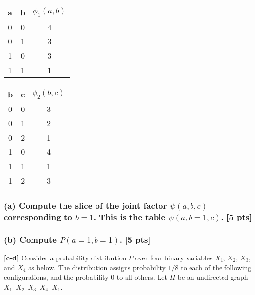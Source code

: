 \documentclass[twoside,11pt]{article}\usepackage{amsmath,amsfonts,amsthm,fullpage}
\begin{document}
\begin{table}[!htb]

    \begin{minipage}{.5\linewidth}

      \centering

    \begin{tabular}{cc|c}
    a & b & $\phi_1(a,b)$ \\ \hline
    0 & 0 & 4             \\
    0 & 1 & 3             \\
    1 & 0 & 3             \\
    1 & 1 & 1             \\
    \end{tabular}

    \end{minipage}%
    \begin{minipage}{.5\linewidth}
      \centering
     \begin{tabular}{cc|c}
    b & c & $\phi_2(b,c)$ \\ \hline
    0 & 0 & 3             \\
    0 & 1 & 2             \\
    0 & 2 & 1             \\
    1 & 0 & 4             \\
    1 & 1 & 1             \\
    1 & 2 & 3             \\
    \end{tabular}
    \end{minipage}
\end{table}

\subsubsection*{(a) Compute the slice of the joint factor $\psi(a,b,c)$ corresponding to $b = 1$. This is the table $\psi(a,b=1,c)$. [5 pts]}

\subsubsection*{(b) Compute $P(a = 1,b = 1)$. [5 pts]}



\iffalse
\textbf{[c-d]} Consider a probability distribution $P$ over four
binary variables $X_1$, $X_2$, $X_3$, and $X_4$ as below. The
distribution assigns probability $1/8$ to each of the following
configurations, and the probability 0 to all others. Let $H$ be an
undirected graph $X_1$--$X_2$--$X_3$--$X_4$--$X_1$.
\end{document}
